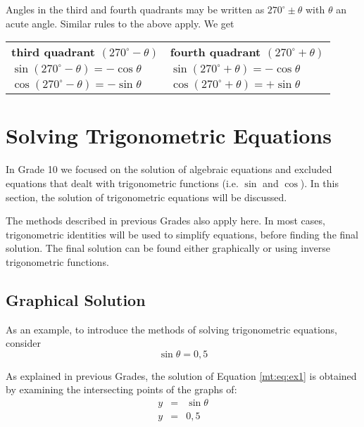 {
Angles in the third and fourth quadrants may be written as $270^\circ \pm \theta$ with $\theta$ an acute angle. Similar rules to the above apply. We get
\begin{center}
\begin{tabular}{l|l}
\textbf{third quadrant $(270^\circ-\theta)$} & \textbf{fourth quadrant $(270^\circ+\theta)$} \\
 $\sin(270^\circ-\theta) = -\cos\theta$ & $\sin(270^\circ+\theta) = -\cos\theta$ \\
 $\cos(270^\circ-\theta) = -\sin\theta$ & $\cos(270^\circ+\theta) = +\sin\theta$ \\
\end{tabular}
\end{center}
} %


\section{Solving Trigonometric Equations}
\label{m:t11:e}


In Grade 10 we focused on the solution of algebraic equations and excluded equations that dealt with trigonometric functions (i.e. $\sin$ and $\cos$). In this section, the solution of trigonometric equations will be discussed. 

The methods described in previous Grades also apply here. 
In most cases, trigonometric identities will be used to simplify equations, before finding the final solution. The final solution can be found either graphically or using inverse trigonometric functions.

\subsection{Graphical Solution}
As an example, to introduce the methods of solving trigonometric equations, consider
\begin{equation}
\label{mt:eq:ex1}
\sin \theta = 0,5
\end{equation}

As explained in previous Grades,%
 the solution of Equation \ref{mt:eq:ex1} is obtained by examining the intersecting points of the graphs of:
\begin{eqnarray*}
y&=&\sin \theta\\
y&=&0,5
\end{eqnarray*}

